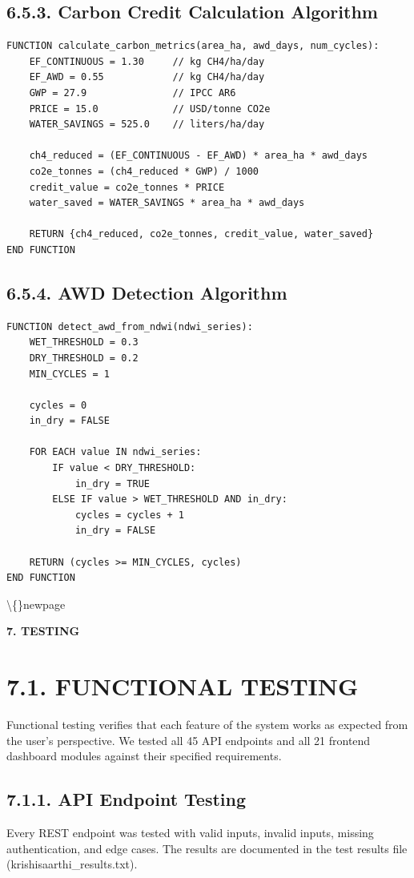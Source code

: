 \documentclass[12pt, a4paper]{report}
\begin{document}
\subsection{6.5.3. Carbon Credit Calculation Algorithm}
\begin{Verbatim}[fontsize=\small]
FUNCTION calculate_carbon_metrics(area_ha, awd_days, num_cycles):
    EF_CONTINUOUS = 1.30     // kg CH4/ha/day
    EF_AWD = 0.55            // kg CH4/ha/day
    GWP = 27.9               // IPCC AR6
    PRICE = 15.0             // USD/tonne CO2e
    WATER_SAVINGS = 525.0    // liters/ha/day

    ch4_reduced = (EF_CONTINUOUS - EF_AWD) * area_ha * awd_days
    co2e_tonnes = (ch4_reduced * GWP) / 1000
    credit_value = co2e_tonnes * PRICE
    water_saved = WATER_SAVINGS * area_ha * awd_days

    RETURN {ch4_reduced, co2e_tonnes, credit_value, water_saved}
END FUNCTION
\end{Verbatim}
\subsection{6.5.4. AWD Detection Algorithm}
\begin{Verbatim}[fontsize=\small]
FUNCTION detect_awd_from_ndwi(ndwi_series):
    WET_THRESHOLD = 0.3
    DRY_THRESHOLD = 0.2
    MIN_CYCLES = 1

    cycles = 0
    in_dry = FALSE

    FOR EACH value IN ndwi_series:
        IF value < DRY_THRESHOLD:
            in_dry = TRUE
        ELSE IF value > WET_THRESHOLD AND in_dry:
            cycles = cycles + 1
            in_dry = FALSE

    RETURN (cycles >= MIN_CYCLES, cycles)
END FUNCTION
\end{Verbatim}
\textbackslash\{\}newpage

\begin{center}
{\fontsize{14}{17}\bfseries 7. TESTING}\\
\end{center}
\section{7.1. FUNCTIONAL TESTING}
Functional testing verifies that each feature of the system works as expected from the user's perspective. We tested all 45 API endpoints and all 21 frontend dashboard modules against their specified requirements.

\subsection{7.1.1. API Endpoint Testing}
Every REST endpoint was tested with valid inputs, invalid inputs, missing authentication, and edge cases. The results are documented in the test results file (krishisaarthi\_results.txt).
\end{document}

